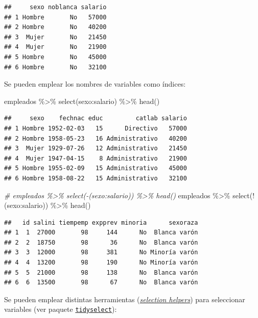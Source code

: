 \documentclass[
]{book}
\newenvironment{Shaded}{\begin{snugshade}}{\end{snugshade}}
\newcommand{\CommentTok}[1]{\textcolor[rgb]{0.56,0.35,0.01}{\textit{#1}}}
\newcommand{\FunctionTok}[1]{\textcolor[rgb]{0.00,0.00,0.00}{#1}}
\newcommand{\NormalTok}[1]{#1}
\newcommand{\SpecialCharTok}[1]{\textcolor[rgb]{0.00,0.00,0.00}{#1}}
\theoremstyle{break}
\theoremstyle{nonumberplain}
\begin{document}
\begin{verbatim}
##     sexo noblanca salario
## 1 Hombre       No   57000
## 2 Hombre       No   40200
## 3  Mujer       No   21450
## 4  Mujer       No   21900
## 5 Hombre       No   45000
## 6 Hombre       No   32100
\end{verbatim}

Se pueden emplear los nombres de variables como índices:

\begin{Shaded}
\begin{Highlighting}[]
\NormalTok{empleados }\SpecialCharTok{\%\textgreater{}\%} \FunctionTok{select}\NormalTok{(sexo}\SpecialCharTok{:}\NormalTok{salario) }\SpecialCharTok{\%\textgreater{}\%} \FunctionTok{head}\NormalTok{()}
\end{Highlighting}
\end{Shaded}

\begin{verbatim}
##     sexo    fechnac educ         catlab salario
## 1 Hombre 1952-02-03   15      Directivo   57000
## 2 Hombre 1958-05-23   16 Administrativo   40200
## 3  Mujer 1929-07-26   12 Administrativo   21450
## 4  Mujer 1947-04-15    8 Administrativo   21900
## 5 Hombre 1955-02-09   15 Administrativo   45000
## 6 Hombre 1958-08-22   15 Administrativo   32100
\end{verbatim}

\begin{Shaded}
\begin{Highlighting}[]
\CommentTok{\# empleados \%\textgreater{}\% select({-}(sexo:salario)) \%\textgreater{}\% head()}
\NormalTok{empleados }\SpecialCharTok{\%\textgreater{}\%} \FunctionTok{select}\NormalTok{(}\SpecialCharTok{!}\NormalTok{(sexo}\SpecialCharTok{:}\NormalTok{salario)) }\SpecialCharTok{\%\textgreater{}\%} \FunctionTok{head}\NormalTok{()}
\end{Highlighting}
\end{Shaded}

\begin{verbatim}
##   id salini tiempemp expprev minoria      sexoraza
## 1  1  27000       98     144      No  Blanca varón
## 2  2  18750       98      36      No  Blanca varón
## 3  3  12000       98     381      No Minoría varón
## 4  4  13200       98     190      No Minoría varón
## 5  5  21000       98     138      No  Blanca varón
## 6  6  13500       98      67      No  Blanca varón
\end{verbatim}

Se pueden emplear distintas herramientas (\emph{\href{https://tidyselect.r-lib.org/reference/language.html}{selection helpers}}) para seleccionar variables (ver paquete \href{https://tidyselect.r-lib.org}{\texttt{tidyselect}}):
\end{document}
